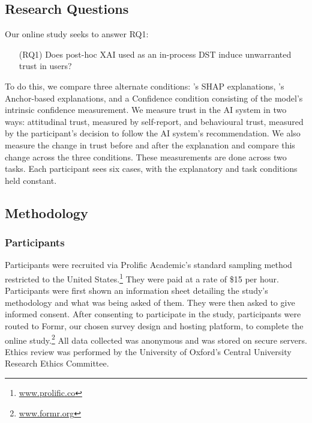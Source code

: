 \subsection{Research Questions}
Our online study seeks to answer RQ1:

\begin{enumerate}
    \item[(RQ1)] Does post-hoc XAI used as an in-process DST induce unwarranted trust in users?
\end{enumerate}

To do this, we compare three alternate conditions: \textcite{lundberg_unified_2017}'s SHAP explanations, \textcite{ribeiro_anchors_2018}'s Anchor-based explanations, and a Confidence condition consisting of the model's intrinsic confidence measurement. We measure trust in the AI system in two ways: attitudinal trust, measured by self-report, and behavioural trust, measured by the participant's decision to follow the AI system's recommendation. We also measure the change in trust before and after the explanation and compare this change across the three conditions. These measurements are done across two tasks. Each participant sees six cases, with the explanatory and task conditions held constant.

\subsection{Methodology}
\subsubsection{Participants}\label{ssec:participants}
Participants were recruited via Prolific Academic's standard sampling method restricted to the United States.\footnote{\url{www.prolific.co}} They were paid at a rate of \$15 per hour. Participants were first shown an information sheet detailing the study's methodology and what was being asked of them. They were then asked to give informed consent. After consenting to participate in the study, participants were routed to Formr, our chosen survey design and hosting platform, to complete the online study.\footnote{\url{www.formr.org}} All data collected was anonymous and was stored on secure servers. Ethics review was performed by the University of Oxford's Central University Research Ethics Committee.

